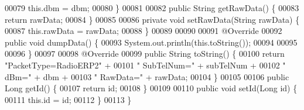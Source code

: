 \begin{DoxyCode}
00079         this.dbm = dbm;
00080     \}
00081 
00082     \textcolor{keyword}{public} String getRawData() \{
00083         \textcolor{keywordflow}{return} rawData;
00084     \}
00085 
00086     \textcolor{keyword}{private} \textcolor{keywordtype}{void} setRawData(String rawData) \{
00087         this.rawData = rawData;
00088     \}
00089 
00090 
00091     @Override
00092     \textcolor{keyword}{public} \textcolor{keywordtype}{void} dumpData() \{
00093         System.out.println(this.toString());
00094 
00095 
00096     \}
00097 
00098     @Override
00099     \textcolor{keyword}{public} String toString() \{
00100         \textcolor{keywordflow}{return} \textcolor{stringliteral}{"PacketType=RadioERP2"} +
00101                 \textcolor{stringliteral}{" SubTelNum="} + subTelNum +
00102                 \textcolor{stringliteral}{" dBm="} + dbm +
00103                 \textcolor{stringliteral}{" RawData="} + rawData;
00104     \}
00105 
00106     \textcolor{keyword}{public} Long getId() \{
00107         \textcolor{keywordflow}{return} id;
00108     \}
00109 
00110     \textcolor{keyword}{public} \textcolor{keywordtype}{void} setId(Long \textcolor{keywordtype}{id}) \{
00111         this.\textcolor{keywordtype}{id} = id;
00112     \}
00113 \}
\end{DoxyCode}
